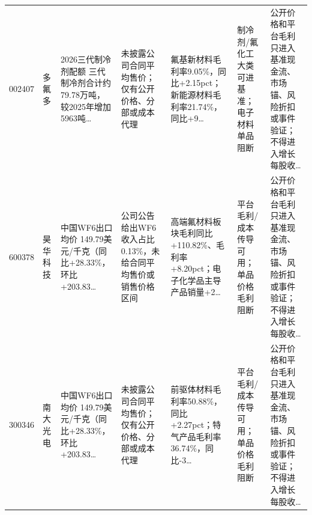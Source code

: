\begin{exhibitbox}[价格与毛利入模门禁（1）]
\begin{tabularx}{\exhibitboxwidth}{L{0.85cm} L{1.05cm} X X X X X}
002407 & 多氟多 & 2026三代制冷剂配额 三代制冷剂合计约79.78万吨，较2025年增加5963吨… & 未披露公司合同平均售价；仅有公开价格、分部或成本代理 & 氟基新材料毛利率9.05\%，同比+2.15pct；新能源材料毛利率21.74\%，同比+9… & 制冷剂/氟化工大类可进基准；电子材料单品阻断 & 公开价格和平台毛利只进入基准现金流、市场锚、风险折扣或事件验证；不得进入增长每股收… \\
600378 & 昊华科技 & 中国WF6出口均价 149.79美元/千克（同比+28.33\%，环比+203.83… & 公司公告给出WF6收入占比0.13\%，未给合同平均售价或销售价格区间 & 高端氟材料板块毛利同比+110.82\%、毛利率+8.20pct；电子化学品主导产品销量+2… & 平台毛利/成本传导可用；单品价格毛利阻断 & 公开价格和平台毛利只进入基准现金流、市场锚、风险折扣或事件验证；不得进入增长每股收… \\
300346 & 南大光电 & 中国WF6出口均价 149.79美元/千克（同比+28.33\%，环比+203.83… & 未披露公司合同平均售价；仅有公开价格、分部或成本代理 & 前驱体材料毛利率50.88\%，同比+2.27pct；特气产品毛利率36.74\%，同比-3… & 平台毛利/成本传导可用；单品价格毛利阻断 & 公开价格和平台毛利只进入基准现金流、市场锚、风险折扣或事件验证；不得进入增长每股收… \\
\bottomrule
\end{tabularx}
\end{exhibitbox}


